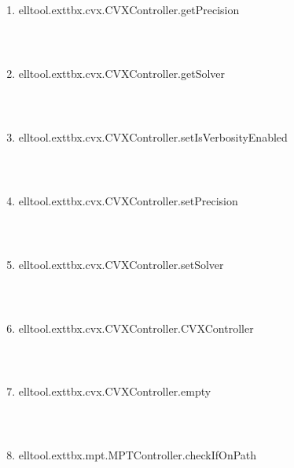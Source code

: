 \begin{enumerate}
\begin{lstlisting}
\end{lstlisting}
\fontfamily{\familydefault}
\selectfont
\item {elltool.exttbx.cvx.CVXController.getPrecision}
\selectfont
\begin{lstlisting}



\end{lstlisting}
\fontfamily{\familydefault}
\selectfont
\item {elltool.exttbx.cvx.CVXController.getSolver}
\selectfont
\begin{lstlisting}



\end{lstlisting}
\fontfamily{\familydefault}
\selectfont
\item {elltool.exttbx.cvx.CVXController.setIsVerbosityEnabled}
\selectfont
\begin{lstlisting}



\end{lstlisting}
\fontfamily{\familydefault}
\selectfont
\item {elltool.exttbx.cvx.CVXController.setPrecision}
\selectfont
\begin{lstlisting}



\end{lstlisting}
\fontfamily{\familydefault}
\selectfont
\item {elltool.exttbx.cvx.CVXController.setSolver}
\selectfont
\begin{lstlisting}



\end{lstlisting}
\fontfamily{\familydefault}
\selectfont
\item {elltool.exttbx.cvx.CVXController.CVXController}
\selectfont
\begin{lstlisting}



\end{lstlisting}
\fontfamily{\familydefault}
\selectfont
\item {elltool.exttbx.cvx.CVXController.empty}
\selectfont
\begin{lstlisting}



\end{lstlisting}
\fontfamily{\familydefault}
\selectfont
\item {elltool.exttbx.mpt.MPTController.checkIfOnPath}
\selectfont
\begin{lstlisting}




\end{lstlisting}
\end{enumerate}
